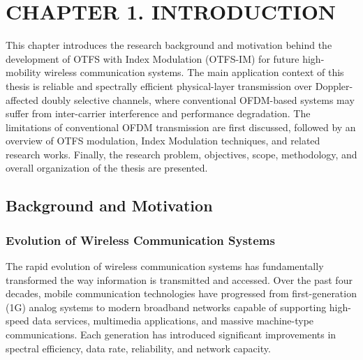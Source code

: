 \setcounter{figure}{0}
\setcounter{table}{0}
\setcounter{equation}{0}
\setcounter{section}{1}
\setcounter{subsection}{0}
\setcounter{subsubsection}{0}

\renewcommand{\thefigure}{1.\arabic{figure}}
\renewcommand{\thetable}{1.\arabic{table}}
\renewcommand{\theequation}{1.\arabic{equation}}
\renewcommand{\theHfigure}{1.\arabic{figure}}
\renewcommand{\theHtable}{1.\arabic{table}}
\renewcommand{\theHequation}{1.\arabic{equation}}
\section*{CHAPTER 1. INTRODUCTION}

This chapter introduces the research background and motivation behind the development of OTFS with Index Modulation (OTFS-IM) for future high-mobility wireless communication systems. The main application context of this thesis is reliable and spectrally efficient physical-layer transmission over Doppler-affected doubly selective channels, where conventional OFDM-based systems may suffer from inter-carrier interference and performance degradation. The limitations of conventional OFDM transmission are first discussed, followed by an overview of OTFS modulation, Index Modulation techniques, and related research works. Finally, the research problem, objectives, scope, methodology, and overall organization of the thesis are presented.

\subsection{Background and Motivation}


\subsubsection{Evolution of Wireless Communication Systems}

The rapid evolution of wireless communication systems has fundamentally transformed the way information is transmitted and accessed. Over the past four decades, mobile communication technologies have progressed from first-generation (1G) analog systems to modern broadband networks capable of supporting high-speed data services, multimedia applications, and massive machine-type communications. Each generation has introduced significant improvements in spectral efficiency, data rate, reliability, and network capacity.

